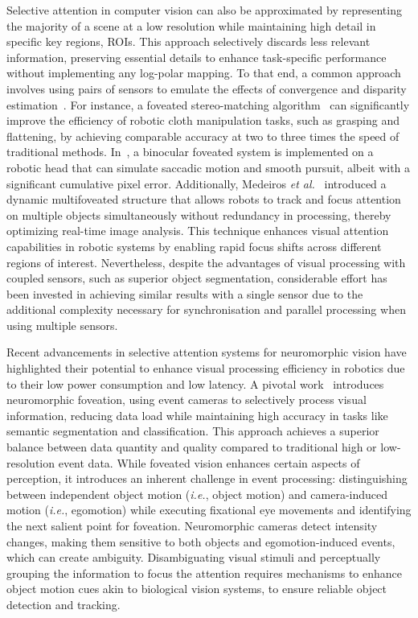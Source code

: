 Selective attention in computer vision can also be approximated by representing the majority of a scene at a low resolution while maintaining high detail in specific key regions, ROIs. This approach selectively discards less relevant information, preserving essential details to enhance task-specific performance without implementing any log-polar mapping.
To that end, a common approach involves using pairs of sensors to emulate the effects of convergence and disparity estimation~\cite{ChessaMurgiaNardelliEtAl_2014_BioinspiredActiveVision}. For instance, a foveated stereo-matching algorithm~\cite{xu2016evaluation} can significantly improve the efficiency of robotic cloth manipulation tasks, such as grasping and flattening, by achieving comparable accuracy at two to three times the speed of traditional methods. In~\cite{Scassellati_1999_BinocularFoveatedActive}, a binocular foveated system is implemented on a robotic head that can simulate saccadic motion and smooth pursuit, albeit with a significant cumulative pixel error. Additionally, Medeiros \emph{et al.}~\cite{medeiros2020dynamic} introduced a dynamic multifoveated structure that allows robots to track and focus attention on multiple objects simultaneously without redundancy in processing, thereby optimizing real-time image analysis. This technique enhances visual attention capabilities in robotic systems by enabling rapid focus shifts across different regions of interest. Nevertheless, despite the advantages of visual processing with coupled sensors, such as superior object segmentation, considerable effort has been invested in achieving similar results with a single sensor due to the additional complexity necessary for synchronisation and parallel processing when using multiple sensors.

Recent advancements in selective attention systems for neuromorphic vision have highlighted their potential to enhance visual processing efficiency in robotics due to their low power consumption and low latency. 
A pivotal work~\cite{gruel2023stakes} introduces neuromorphic foveation, using event cameras to selectively process visual information, reducing data load while maintaining high accuracy in tasks like semantic segmentation and classification. This approach achieves a superior balance between data quantity and quality compared to traditional high or low-resolution event data.
While foveated vision enhances certain aspects of perception, it introduces an inherent challenge in event processing: distinguishing between independent object motion (\emph{i.e.}, object motion) and camera-induced motion (\emph{i.e.}, egomotion) while executing fixational eye movements and identifying the next salient point for foveation.
Neuromorphic cameras detect intensity changes, making them sensitive to both objects and egomotion-induced events, which can create ambiguity. Disambiguating visual stimuli and perceptually grouping the information to focus the attention requires mechanisms to enhance object motion cues akin to biological vision systems, to ensure reliable object detection and tracking.

